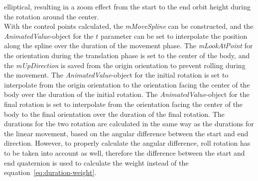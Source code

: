 elliptical, resulting in a zoom effect from the start to the end orbit height during the rotation around the center.
\\
With the control points calculated, the \textit{mMoveSpline} can be constructed, and the
\textit{AnimatedValue}-object for the $t$ parameter can be set to interpolate the position along the spline over the
duration of the movement phase.
The \textit{mLookAtPoint} for the orientation during the translation phase is set to the center of the body, and the
\textit{mUpDirection} is saved from the origin orientation to prevent rolling during the movement.
The \textit{AnimatedValue}-object for the initial rotation is set to interpolate from the origin orientation to the
orientation facing the center of the body over the duration of the initial rotation.
The \textit{AnimatedValue}-object for the final rotation is set to interpolate from the orientation facing the center
of the body to the final orientation over the duration of the final rotation.
The durations for the two rotation are calculated in the same way as the durations for the linear movement, based on
the angular difference between the start and end direction.
However, to properly calculate the angular difference, roll rotation has to be taken into account as well, therefore
the difference between the start and end quaternion is used to calculate the weight instead of the
equation~\ref{eq:duration-weight}.
